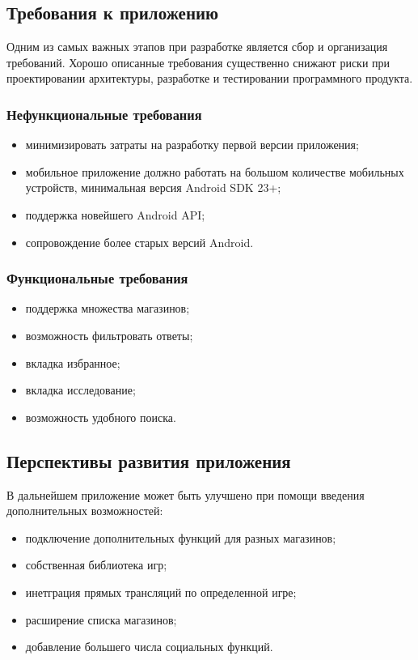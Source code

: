 \subsection{Требования к приложению}
Одним из самых важных этапов при разработке является сбор и организация требований. Хорошо описанные требования существенно снижают риски при проектировании архитектуры, разработке и тестировании программного продукта.
 
\subsubsection{Нефункциональные требования}
\begin{itemize}
 \item минимизировать затраты на разработку первой версии приложения;
 \item мобильное приложение должно работать на большом количестве мобильных устройств, минимальная версия Android SDK 23+;
 \item поддержка новейшего Android API;
 \item сопровождение более старых версий Android.
\end{itemize}
 
\subsubsection{Функциональные требования}
\begin{itemize}
  \item поддержка множества магазинов;
  \item возможность фильтровать ответы;
  \item вкладка избранное;
  \item вкладка исследование;
  \item возможность удобного поиска.
\end{itemize}
 
\subsection{Перспективы развития приложения}
В дальнейшем приложение может быть улучшено при помощи введения дополнительных возможностей:
\begin{itemize}
  \item подключение дополнительных функций для разных магазинов;
  \item собственная библиотека игр;
  \item инетграция прямых трансляций по определенной игре;
  \item расширение списка магазинов;
  \item добавление большего числа социальных функций.
\end{itemize}
